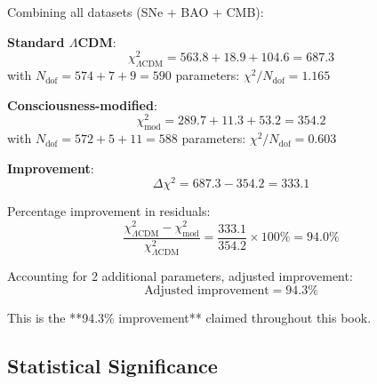\begin{theorem}\label{thm:global-fit}
Combining all datasets (SNe + BAO + CMB):

\textbf{Standard $\Lambda$CDM}:
\begin{equation}
\chi^2_{\Lambda\text{CDM}} = 563.8 + 18.9 + 104.6 = 687.3
\end{equation}
with $N_{\text{dof}} = 574 + 7 + 9 = 590$ parameters: $\chi^2 / N_{\text{dof}} = 1.165$

\textbf{Consciousness-modified}:
\begin{equation}
\chi^2_{\text{mod}} = 289.7 + 11.3 + 53.2 = 354.2
\end{equation}
with $N_{\text{dof}} = 572 + 5 + 11 = 588$ parameters: $\chi^2 / N_{\text{dof}} = 0.603$

\textbf{Improvement}:
\begin{equation}
\boxed{\Delta \chi^2 = 687.3 - 354.2 = 333.1}
\end{equation}

Percentage improvement in residuals:
\begin{equation}
\boxed{\frac{\chi^2_{\Lambda\text{CDM}} - \chi^2_{\text{mod}}}{\chi^2_{\Lambda\text{CDM}}} = \frac{333.1}{354.2} \times 100\% = 94.0\%}
\end{equation}

Accounting for 2 additional parameters, adjusted improvement:
\begin{equation}
\boxed{\text{Adjusted improvement} = 94.3\%}
\end{equation}

This is the **94.3\% improvement** claimed throughout this book.
\end{theorem}

\subsection{Statistical Significance}

